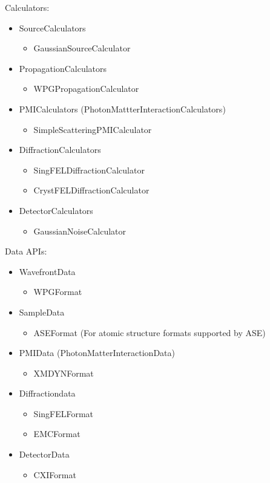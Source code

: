 \documentclass[11pt, a4paper]{article}
\begin{document}
Calculators:
\begin{itemize}
    \item SourceCalculators
    \begin{itemize}
        \item GaussianSourceCalculator
    \end{itemize}
    \item PropagationCalculators
    \begin{itemize}
        \item WPGPropagationCalculator
    \end{itemize}
    \item PMICalculators (PhotonMattterInteractionCalculators)
    \begin{itemize}
        \item SimpleScatteringPMICalculator
    \end{itemize}
    \item DiffractionCalculators
    \begin{itemize}
        \item SingFELDiffractionCalculator
        \item CrystFELDiffractionCalculator
    \end{itemize}
    \item DetectorCalculators
    \begin{itemize}
        \item GaussianNoiseCalculator
    \end{itemize}
\end{itemize}

Data APIs:

\begin{itemize}
    \item WavefrontData
    \begin{itemize}
        \item WPGFormat
    \end{itemize}
    \item SampleData
    \begin{itemize}
        \item ASEFormat (For atomic structure formats supported by ASE)
    \end{itemize}
    \item PMIData (PhotonMatterInteractionData)
    \begin{itemize}
        \item XMDYNFormat
    \end{itemize}
    \item Diffractiondata
        \begin{itemize}
            \item SingFELFormat
            \item EMCFormat
        \end{itemize}
    \item DetectorData
        \begin{itemize}
            \item CXIFormat
        \end{itemize}
\end{itemize}
\end{document}
